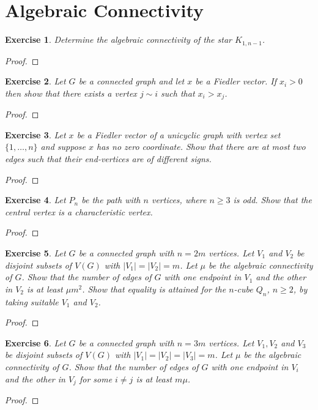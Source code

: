 \documentclass[11pt]{article}
\newtheorem{exercise}{Exercise}[section]
\theoremstyle{definition}
\begin{document}
\clearpage
\section{Algebraic Connectivity}

\begin{exercise}
Determine the algebraic connectivity of the star $K_{1,n-1}$.
\end{exercise}
\begin{proof}
\end{proof}

\begin{exercise}
Let $G$ be a connected graph and let $x$ be a Fiedler vector. If $x_i>0$ then show that
there exists a vertex $j\sim i$ such that $x_i>x_j$.
\end{exercise}
\begin{proof}
\end{proof}

\begin{exercise}
Let $x$ be a Fiedler vector of a unicyclic graph with vertex set $\{1,\ldots,n\}$ and suppose
$x$ has no zero coordinate. Show that there are at most two edges such that their end-vertices
are of different signs.
\end{exercise}
\begin{proof}
\end{proof}

\begin{exercise}
Let $P_n$ be the path with $n$ vertices, where $n\ge 3$ is odd. Show that the central vertex
is a characteristic vertex.
\end{exercise}
\begin{proof}
\end{proof}

\begin{exercise}
Let $G$ be a connected graph with $n=2m$ vertices. Let $V_1$ and $V_2$ be disjoint subsets of
$V(G)$ with $|V_1|=|V_2|=m$. Let $\mu$ be the algebraic connectivity of $G$. Show that the
number of edges of $G$ with one endpoint in $V_1$ and the other in $V_2$ is at least $\mu m^2$.
Show that equality is attained for the $n$-cube $Q_n$, $n\ge 2$, by taking suitable $V_1$ and $V_2$.
\end{exercise}
\begin{proof}
\end{proof}

\begin{exercise}
Let $G$ be a connected graph with $n=3m$ vertices. Let $V_1,V_2$ and $V_3$ be disjoint subsets
of $V(G)$ with $|V_1|=|V_2|=|V_3|=m$. Let $\mu$ be the algebraic connectivity of $G$. Show that
the number of edges of $G$ with one endpoint in $V_i$ and the other in $V_j$ for some $i\ne j$
is at least $m\mu$.
\end{exercise}
\begin{proof}
\end{proof}
\end{document}
